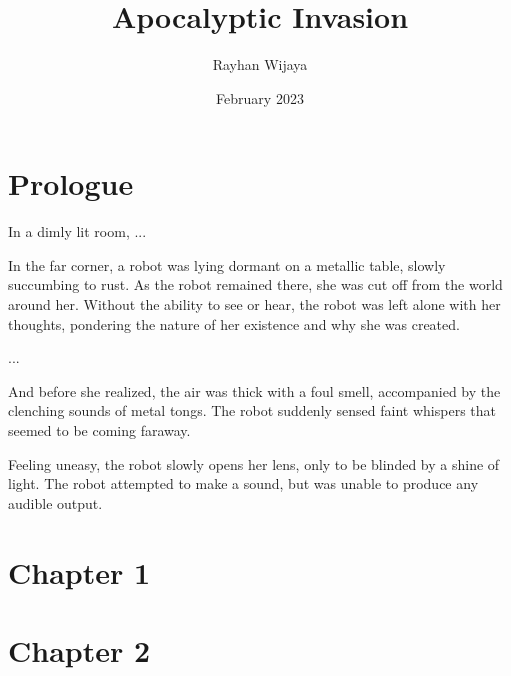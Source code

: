 \documentclass[12pt]{book}
\title{Apocalyptic Invasion}
\author{Rayhan Wijaya}
\date{February 2023}
\begin{document}
\maketitle

\section*{Prologue}

In a dimly lit room, ...

In the far corner, a robot was lying dormant on a metallic table, slowly
succumbing to rust. As the robot remained there, she was cut off from the world
around her. Without the ability to see or hear, the robot was left alone with
her thoughts, pondering the nature of her existence and why she was created.

...

And before she realized, the air was thick with a foul smell, accompanied by
the clenching sounds of metal tongs. The robot suddenly sensed faint whispers
that seemed to be coming faraway.

Feeling uneasy, the robot slowly opens her lens, only to be blinded by a shine
of light. The robot attempted to make a sound, but was unable to produce any
audible output.

\section*{Chapter 1}

\section*{Chapter 2}
\end{document}
